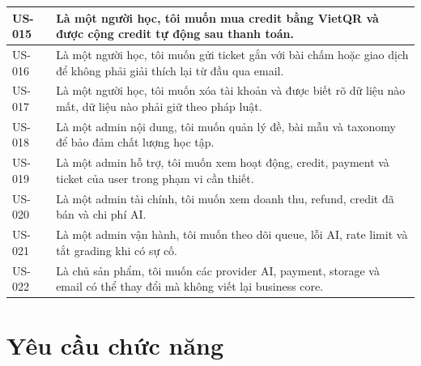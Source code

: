\documentclass[11pt,a4paper]{article}
\begin{document}
\begin{longtable}{|P{0.14\textwidth}|P{0.78\textwidth}|}
US-015 & Là một người học, tôi muốn mua credit bằng VietQR và được cộng credit tự động sau thanh toán. \\ \hline
US-016 & Là một người học, tôi muốn gửi ticket gắn với bài chấm hoặc giao dịch để không phải giải thích lại từ đầu qua email. \\ \hline
US-017 & Là một người học, tôi muốn xóa tài khoản và được biết rõ dữ liệu nào mất, dữ liệu nào phải giữ theo pháp luật. \\ \hline
US-018 & Là một admin nội dung, tôi muốn quản lý đề, bài mẫu và taxonomy để bảo đảm chất lượng học tập. \\ \hline
US-019 & Là một admin hỗ trợ, tôi muốn xem hoạt động, credit, payment và ticket của user trong phạm vi cần thiết. \\ \hline
US-020 & Là một admin tài chính, tôi muốn xem doanh thu, refund, credit đã bán và chi phí AI. \\ \hline
US-021 & Là một admin vận hành, tôi muốn theo dõi queue, lỗi AI, rate limit và tắt grading khi có sự cố. \\ \hline
US-022 & Là chủ sản phẩm, tôi muốn các provider AI, payment, storage và email có thể thay đổi mà không viết lại business core. \\ \hline
\end{longtable}
\normalsize
\section{Yêu cầu chức năng}
\end{document}
